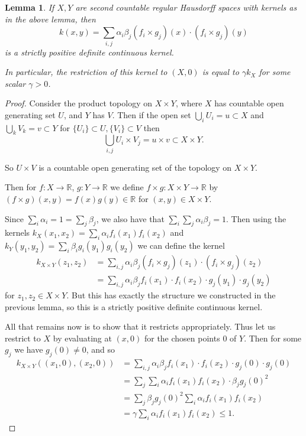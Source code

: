 \documentclass[12pt]{amsart}
\newtheorem{lemma}[theorem]{Lemma}
\theoremstyle{definition}
\numberwithin{equation}{section}
\begin{document}
\begin{lemma}\label{products}
    If $X, Y$ are second countable regular Hausdorff spaces with kernels as in the above lemma, then \[k(x,y) = \sum_{i,j}\alpha_i\beta_j(f_i\times g_j)(x)\cdot(f_i\times g_j)(y)\] is a strictly positive definite continuous kernel. 

    In particular, the restriction of this kernel to $(X, 0)$ is equal to $\gamma k_X$ for some scalar $\gamma > 0$.
\end{lemma}
\begin{proof}

    Consider the product topology on $X \times Y$, where $X$ has countable open generating set $U$, and $Y$ has $V$. Then if the open set $\bigcup_{i} U_{i} =u \subset X$ and $\bigcup_{k}V_{k} = v \subset Y$ for $\{U_i\} \subset U, \{V_i\}\subset V$ then \[\bigcup_{i,j}U_i \times V_j = u\times v \subset X\times Y.\]

    So $U \times V$ is a countable open generating set of the topology on $X\times Y$.

    Then for $f: X \rightarrow \mathbb R$, $g: Y \rightarrow \mathbb R$ we define $f \times g: X\times Y \rightarrow \mathbb R$ by $(f\times g)(x, y) = f(x)g(y) \in \mathbb R$ for $(x, y) \in X\times Y$. 

    Since $\sum_i\alpha_i=1=\sum_j\beta_j$, we also have that $\sum_i\sum_j\alpha_i\beta_j=1$. Then using the kernels $k_X(x_1, x_2) = \sum_i\alpha_if_i(x_1)f_i(x_2)$ and $k_Y(y_1, y_2) = \sum_i\beta_ig_i(y_1)g_i(y_2)$ we can define the kernel \[\begin{split}k_{X\times Y}(z_1, z_2) &= \sum_{i,j}\alpha_i\beta_j(f_i\times g_j)(z_1)\cdot(f_i\times g_j)(z_2) \\&= \sum_{i,j}\alpha_i\beta_jf_i(x_1)\cdot f_i(x_2)\cdot g_j(y_1)\cdot g_j(y_2)\end{split}\]
    for $z_1, z_2 \in X\times Y.$ But this has exactly the structure we constructed in the previous lemma, so this is a strictly positive definite continuous kernel. 

    All that remains now is to show that it restricts appropriately. Thus let us restrict to $X$ by evaluating at $(x, 0)$ for the chosen points $0$ of $Y$. Then for some $g_j$ we have $g_j(0) \neq 0$, and so \[\begin{split}k_{X\times Y}((x_1,0), (x_2, 0)) &= \sum_{i,j}\alpha_i\beta_jf_i(x_1)\cdot f_i(x_2)\cdot g_j(0)\cdot g_j(0)\\&=\sum_j\sum_i\alpha_if_i(x_1)f_i(x_2)\cdot \beta_jg_j(0)^2\\&=\sum_j\beta_jg_j(0)^2\sum_i\alpha_if_i(x_1)f_i(x_2)\\&= \gamma \sum_i\alpha_if_i(x_1)f_i(x_2) \leq 1.\end{split}\]
\end{proof}
\end{document}
